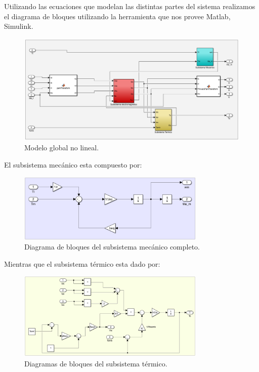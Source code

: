 \documentclass{article}
\begin{document}

Utilizando las ecuaciones que modelan las distintas partes del sistema realizamos el 
diagrama de bloques utilizando la herramienta que nos provee Matlab, Simulink.

\begin{figure}[H]
    \centering
    \includegraphics[width=1\textwidth]{no_lineal.png}
    \caption{Modelo global no lineal.}
\end{figure}

El subsistema mecánico esta compuesto por:

\begin{figure}[H]
    \centering
    \includegraphics[width=0.8\textwidth]{sub_mecanico2.png}
    \caption{Diagrama de bloques del subsistema mecánico completo.}
\end{figure}

Mientras que el subsistema térmico esta dado por:

\begin{figure}[H]
    \centering
    \includegraphics[width=0.8\textwidth]{sub_termico.png}
    \caption{Diagramas de bloques del subsistema térmico.}
\end{figure}
\end{document}
